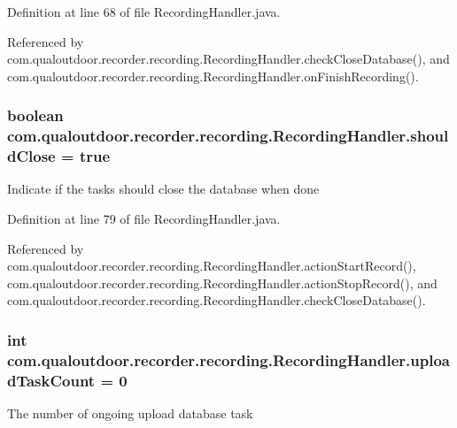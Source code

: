Definition at line 68 of file Recording\-Handler.\-java.



Referenced by com.\-qualoutdoor.\-recorder.\-recording.\-Recording\-Handler.\-check\-Close\-Database(), and com.\-qualoutdoor.\-recorder.\-recording.\-Recording\-Handler.\-on\-Finish\-Recording().

\hypertarget{classcom_1_1qualoutdoor_1_1recorder_1_1recording_1_1RecordingHandler_a14b87c5095adb1269d16fe694206b5c7}{
\subsubsection[{should\-Close}]{\setlength{\rightskip}{0pt plus 5cm}boolean com.\-qualoutdoor.\-recorder.\-recording.\-Recording\-Handler.\-should\-Close = true\hspace{0.3cm}{\ttfamily [private]}}}\label{classcom_1_1qualoutdoor_1_1recorder_1_1recording_1_1RecordingHandler_a14b87c5095adb1269d16fe694206b5c7}
Indicate if the tasks should close the database when done 

Definition at line 79 of file Recording\-Handler.\-java.



Referenced by com.\-qualoutdoor.\-recorder.\-recording.\-Recording\-Handler.\-action\-Start\-Record(), com.\-qualoutdoor.\-recorder.\-recording.\-Recording\-Handler.\-action\-Stop\-Record(), and com.\-qualoutdoor.\-recorder.\-recording.\-Recording\-Handler.\-check\-Close\-Database().

\hypertarget{classcom_1_1qualoutdoor_1_1recorder_1_1recording_1_1RecordingHandler_ab19d014f145253334e05e1aa971fba02}{
\subsubsection[{upload\-Task\-Count}]{\setlength{\rightskip}{0pt plus 5cm}int com.\-qualoutdoor.\-recorder.\-recording.\-Recording\-Handler.\-upload\-Task\-Count = 0\hspace{0.3cm}{\ttfamily [private]}}}\label{classcom_1_1qualoutdoor_1_1recorder_1_1recording_1_1RecordingHandler_ab19d014f145253334e05e1aa971fba02}
The number of ongoing upload database task 

